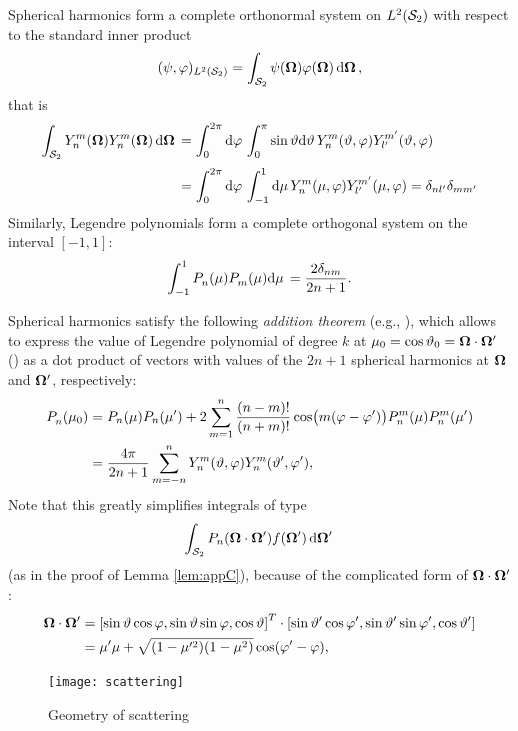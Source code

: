 Spherical harmonics form a complete orthonormal system on $\Lp[2](\Sphere)$ with respect to the
standard inner product $$
(\psi, \varphi)_{\Lp[2](\Sphere)} = \intA{\psi(\bomega) {\varphi(\bomega)}},
$$
that is
\begin{equation}\label{eq:og}
\begin{aligned}
\intA{\Y{n}{m}(\bomega)\Yc{n}{m}(\bomega)} &=
\int_{0}^{2\pi}\d{\azimuthal}\int_{0}^{\pi}\sin\polar\d{\polar}  
\Y{n}{m}(\polar,\azimuthal)\Yc{l'}{m'}(\polar,\azimuthal)\\[.25em]
& = \int_{0}^{2\pi}\d{\azimuthal}\int_{-1}^{1}\d{\mu}
\Y{n}{m}(\mu,\azimuthal)\Yc{l'}{m'}(\mu,\azimuthal) = \kron{n}{l'}\kron{m}{m'}
\end{aligned}
\end{equation}
Similarly, Legendre polynomials form a complete orthogonal system on the interval $[-1,1]$:
$$
	\muint {\P{n}{}(\mu)\P{m}{}(\mu)} = \frac{2\kron{n}{m}}{2n + 1}.
$$

Spherical harmonics satisfy the
following \textit{addition theorem} (e.g., \cite[Remark 3.88]{Schreiner}), which allows to express the value of Legendre
polynomial of degree $k$ at $\mu_0 = \cos\polar_0 = \bomega\cdot\bomega'$ () as a dot product of
vectors with values of the $2n+1$ spherical harmonics at $\bomega$ and $\bomega'$, respectively:
\begin{align}
\P{n}{}(\mu_0)
&=P_n(\mu) P_n(\mu')+2 \sum _{m = 1}^n \frac{(n-m)!}{(n+m)!} \cos \bigl(m(\azimuthal - \azimuthal')\bigr) P_n^m(\mu) P_n^m(\mu')\nonumber\\
&=\frac{4\pi}{2n+1}\suma[m]{-n}{n}\Y{n}{m}(\polar,\azimuthal)\Yc{n}{m}(\polar',\azimuthal'),
\label{eq:additionThm}
\end{align}
Note that this greatly simplifies integrals of type
$$
\intA[']{P_n(\bomega\cdot\bomega')f(\bomega')}
$$
(as in the proof of Lemma \ref{lem:appC}), because of the complicated form of $\bomega\cdot\bomega'$:
$$
\begin{aligned}
	\bomega\cdot\bomega' 
&= \lvect{\sint\cosp,\sint\sinp,\cost} \cdot \lvec{\sint'\cosp',\sint'\sinp',\cost'} \\
& = \mu'\mu + \sqrt{(1-\mu'^2)(1-\mu^2)}\cos(\azimuthal' - \azimuthal),
\end{aligned}
$$
\begin{figure}[!hbt]
    \centering
    \texttt{[image: scattering]}
    \caption[Scattering]{Geometry of scattering}
    \label{fig:scatter}
\end{figure}

